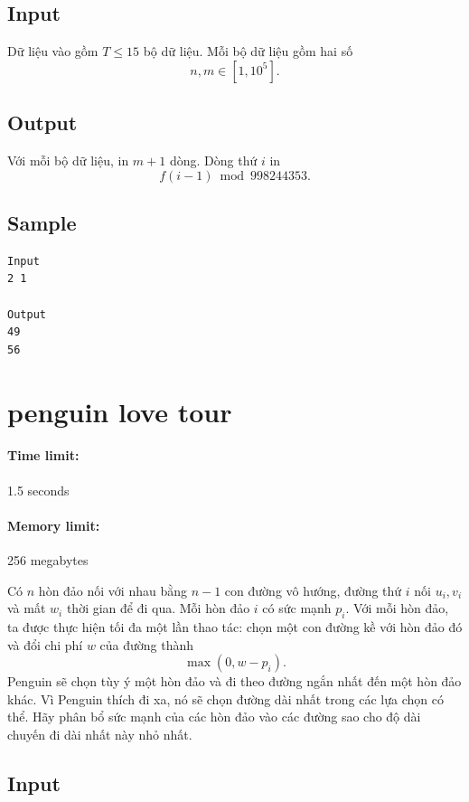 \documentclass[11pt]{article}
\begin{document}
\subsection*{Input}

Dữ liệu vào gồm \(T\le 15\) bộ dữ liệu. Mỗi bộ dữ liệu gồm hai số
\[
  n,m\in[1,10^5].
\]

\subsection*{Output}

Với mỗi bộ dữ liệu, in \(m+1\) dòng. Dòng thứ \(i\) in
\[
  f(i-1)\bmod 998244353.
\]

\subsection*{Sample}

\begin{verbatim}
Input
2 1

Output
49
56
\end{verbatim}

\section{penguin love tour}

\paragraph{Time limit:} 1.5 seconds
\paragraph{Memory limit:} 256 megabytes

Có \(n\) hòn đảo nối với nhau bằng \(n-1\) con đường vô hướng, đường thứ \(i\)
nối \(u_i,v_i\) và mất \(w_i\) thời gian để đi qua. Mỗi hòn đảo \(i\) có sức
mạnh \(p_i\). Với mỗi hòn đảo, ta được thực hiện tối đa một lần thao tác:
chọn một con đường kề với hòn đảo đó và đổi chi phí \(w\) của đường thành
\[
  \max(0,w-p_i).
\]
Penguin sẽ chọn tùy ý một hòn đảo và đi theo đường ngắn nhất đến một hòn đảo
khác. Vì Penguin thích đi xa, nó sẽ chọn đường dài nhất trong các lựa chọn có
thể. Hãy phân bổ sức mạnh của các hòn đảo vào các đường sao cho độ dài chuyến
đi dài nhất này nhỏ nhất.

\subsection*{Input}
\end{document}

